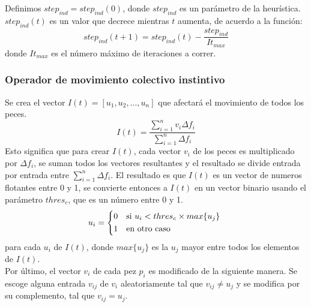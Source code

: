 \documentclass[12pt]{article}
\begin{document}
Definimos $step_{ind} = step_{ind}(0)$, donde $step_{ind}$ es un parámetro de la heurística. $step_{ind}(t)$ es un valor que decrece mientras $t$ aumenta, de acuerdo a la función:
\begin{equation*}
  step_{ind}(t + 1) = step_{ind}(t) - \frac{step_{ind}}{It_{max}}
\end{equation*}
donde $It_{max}$ es el número máximo de iteraciones a correr.

\subsubsection{Operador de movimiento colectivo instintivo}
Se crea el vector $I(t) = [u_1, u_2,...,u_n]$ que afectará el movimiento de todos los peces.
\begin{equation*}
  I(t) = \frac{\sum_{i=1}^nv_i\Delta f_i}{\sum_{i=1}^n\Delta f_i}
\end{equation*}
Esto significa que para crear $I(t)$, cada vector $v_i$ de los peces es multiplicado por $\Delta f_i$, se suman todos los vectores resultantes y el resultado se divide entrada por entrada entre $\sum_{i=1}^n\Delta f_i$. El resultado es que $I(t)$ es un vector de numeros flotantes entre 0 y 1, se convierte entonces a $I(t)$ en un  vector binario usando el parámetro $thres_c$, que es un número entre 0 y 1.
\begin{equation*}
  u_i =
  \begin{cases*}
    0 & si $u_i < thres_c \times max\{u_j\}$ \\
    1 & en otro caso 
  \end{cases*}
\end{equation*}
para cada $u_i$ de $I(t)$, donde $max\{u_j\}$ es la $u_j$ mayor entre todos los elementos de $I(t)$. \\

Por último, el vector $v_i$ de cada pez $p_i$ es modificado de la siguiente manera. Se escoge alguna entrada $v_{ij}$ de $v_i$ aleatoriamente tal que $v_{ij} \neq u_j$ y se modifica por su complemento, tal que $v_{ij} = u_j$.
\end{document}
